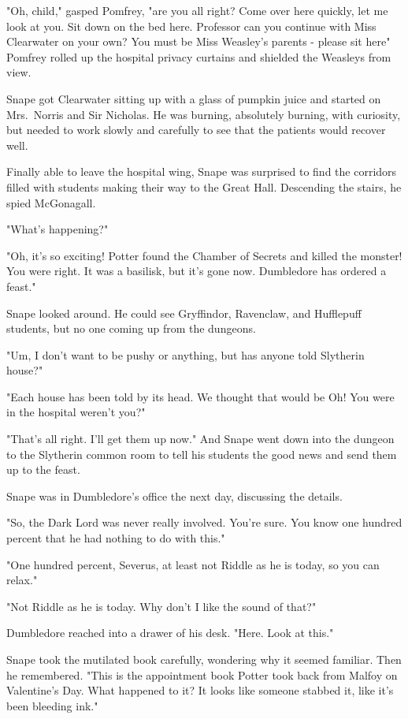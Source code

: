 "Oh, child," gasped Pomfrey, "are you all right? Come over here quickly, let me look at you. Sit down on the bed here. Professor can you continue with Miss Clearwater on your own? You must be Miss Weasley's parents - please sit here{\el}" Pomfrey rolled up the hospital privacy curtains and shielded the Weasleys from view.

Snape got Clearwater sitting up with a glass of pumpkin juice and started on Mrs.~Norris and Sir Nicholas. He was burning, absolutely burning, with curiosity, but needed to work slowly and carefully to see that the patients would recover well.

Finally able to leave the hospital wing, Snape was surprised to find the corridors filled with students making their way to the Great Hall. Descending the stairs, he spied McGonagall.

"What's happening?"

"Oh, it's so exciting! Potter found the Chamber of Secrets and killed the monster! You were right. It was a basilisk, but it's gone now. Dumbledore has ordered a feast."

Snape looked around. He could see Gryffindor, Ravenclaw, and Hufflepuff students, but no one coming up from the dungeons.

"Um, I don't want to be pushy or anything, but has anyone told Slytherin house?"

"Each house has been told by its head. We thought that would be{\el} Oh! You were in the hospital weren't you?"

"That's all right. I'll get them up now." And Snape went down into the dungeon to the Slytherin common room to tell his students the good news and send them up to the feast.

Snape was in Dumbledore's office the next day, discussing the details.

"So, the Dark Lord was never really involved. You're sure. You know one hundred percent that he had nothing to do with this."

"One hundred percent, Severus, at least not Riddle as he is today, so you can relax."

"Not Riddle as he is today. Why don't I like the sound of that?"

Dumbledore reached into a drawer of his desk. "Here. Look at this."

Snape took the mutilated book carefully, wondering why it seemed familiar. Then he remembered. "This is the appointment book Potter took back from Malfoy on Valentine's Day. What happened to it? It looks like someone stabbed it, like it's been bleeding ink."

